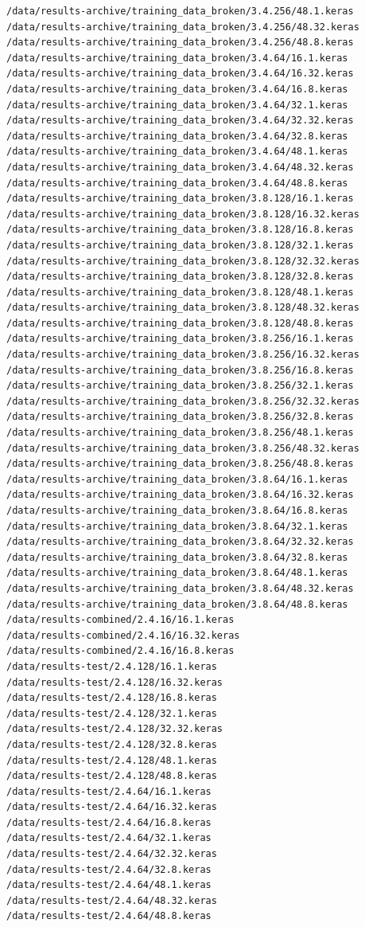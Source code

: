 \documentclass[12pt]{article}
\begin{document}
\begin{lstlisting}[style=logstyle, caption={List of failed trained models. See \ref{issues}}, label={lst:model-list}]
/data/results-archive/training_data_broken/3.4.256/48.1.keras
/data/results-archive/training_data_broken/3.4.256/48.32.keras
/data/results-archive/training_data_broken/3.4.256/48.8.keras
/data/results-archive/training_data_broken/3.4.64/16.1.keras
/data/results-archive/training_data_broken/3.4.64/16.32.keras
/data/results-archive/training_data_broken/3.4.64/16.8.keras
/data/results-archive/training_data_broken/3.4.64/32.1.keras
/data/results-archive/training_data_broken/3.4.64/32.32.keras
/data/results-archive/training_data_broken/3.4.64/32.8.keras
/data/results-archive/training_data_broken/3.4.64/48.1.keras
/data/results-archive/training_data_broken/3.4.64/48.32.keras
/data/results-archive/training_data_broken/3.4.64/48.8.keras
/data/results-archive/training_data_broken/3.8.128/16.1.keras
/data/results-archive/training_data_broken/3.8.128/16.32.keras
/data/results-archive/training_data_broken/3.8.128/16.8.keras
/data/results-archive/training_data_broken/3.8.128/32.1.keras
/data/results-archive/training_data_broken/3.8.128/32.32.keras
/data/results-archive/training_data_broken/3.8.128/32.8.keras
/data/results-archive/training_data_broken/3.8.128/48.1.keras
/data/results-archive/training_data_broken/3.8.128/48.32.keras
/data/results-archive/training_data_broken/3.8.128/48.8.keras
/data/results-archive/training_data_broken/3.8.256/16.1.keras
/data/results-archive/training_data_broken/3.8.256/16.32.keras
/data/results-archive/training_data_broken/3.8.256/16.8.keras
/data/results-archive/training_data_broken/3.8.256/32.1.keras
/data/results-archive/training_data_broken/3.8.256/32.32.keras
/data/results-archive/training_data_broken/3.8.256/32.8.keras
/data/results-archive/training_data_broken/3.8.256/48.1.keras
/data/results-archive/training_data_broken/3.8.256/48.32.keras
/data/results-archive/training_data_broken/3.8.256/48.8.keras
/data/results-archive/training_data_broken/3.8.64/16.1.keras
/data/results-archive/training_data_broken/3.8.64/16.32.keras
/data/results-archive/training_data_broken/3.8.64/16.8.keras
/data/results-archive/training_data_broken/3.8.64/32.1.keras
/data/results-archive/training_data_broken/3.8.64/32.32.keras
/data/results-archive/training_data_broken/3.8.64/32.8.keras
/data/results-archive/training_data_broken/3.8.64/48.1.keras
/data/results-archive/training_data_broken/3.8.64/48.32.keras
/data/results-archive/training_data_broken/3.8.64/48.8.keras
/data/results-combined/2.4.16/16.1.keras
/data/results-combined/2.4.16/16.32.keras
/data/results-combined/2.4.16/16.8.keras
/data/results-test/2.4.128/16.1.keras
/data/results-test/2.4.128/16.32.keras
/data/results-test/2.4.128/16.8.keras
/data/results-test/2.4.128/32.1.keras
/data/results-test/2.4.128/32.32.keras
/data/results-test/2.4.128/32.8.keras
/data/results-test/2.4.128/48.1.keras
/data/results-test/2.4.128/48.8.keras
/data/results-test/2.4.64/16.1.keras
/data/results-test/2.4.64/16.32.keras
/data/results-test/2.4.64/16.8.keras
/data/results-test/2.4.64/32.1.keras
/data/results-test/2.4.64/32.32.keras
/data/results-test/2.4.64/32.8.keras
/data/results-test/2.4.64/48.1.keras
/data/results-test/2.4.64/48.32.keras
/data/results-test/2.4.64/48.8.keras
\end{lstlisting}
\end{document}
